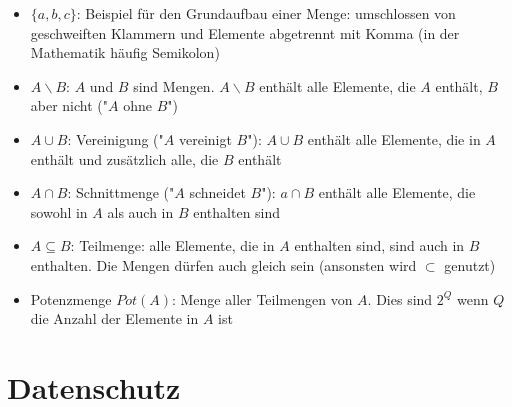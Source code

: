 \documentclass{article}
\begin{document}
	\begin{itemize}
		\item $\{a, b, c\}$: Beispiel für den Grundaufbau einer Menge: umschlossen von geschweiften Klammern und Elemente abgetrennt mit Komma (in der Mathematik häufig Semikolon)
		\item $A \backslash B$: $A$ und $B$ sind Mengen. $A \backslash B$ enthält alle Elemente, die $A$ enthält, $B$ aber nicht ("$A$ ohne $B$")
		\item $A \cup B$: Vereinigung ("$A$ vereinigt $B$"): $A \cup B$ enthält alle Elemente, die in $A$ enthält und zusätzlich alle, die $B$ enthält
		\item $A \cap B$: Schnittmenge ("$A$ schneidet $B$"): $a \cap B$ enthält alle Elemente, die sowohl in $A$ als auch in $B$ enthalten sind
		\item $A \subseteq B$: Teilmenge: alle Elemente, die in $A$ enthalten sind, sind auch in $B$ enthalten. Die Mengen dürfen auch gleich sein (ansonsten wird $\subset$ genutzt)
		\item Potenzmenge $Pot(A)$: Menge aller Teilmengen von $A$. Dies sind $2^Q$ wenn $Q$ die Anzahl der Elemente in $A$ ist
	\end{itemize}

	\section{Datenschutz}
\end{document}
